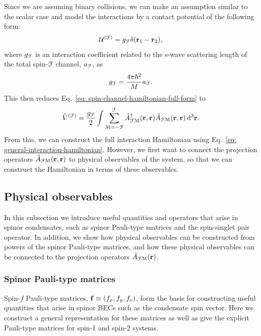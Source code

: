 Since we are assuming binary collisions, we can make an assumption similar to
the scalar case and model the interactions by a contact potential of the
following form:
\begin{align}
    \mathcal{U}^{(\EuScript{F})} = g_\EuScript{F}\delta(\vb{r}_1 - \vb{r}_2),
\end{align}
where \(g_\EuScript{F}\) is an interaction coefficient related to the s-wave
scattering length of the total spin-\(\EuScript{F}\) channel,
\(a_\EuScript{F}\), as
\begin{align}
    g_\EuScript{F} = \frac{4\pi\hbar^2}{M}a_\EuScript{F}.
\end{align}
This then reduces Eq.~\eqref{eq: spin-channel-hamiltonian-full-form} to
\begin{align}\label{eq: spin-channel-hamiltonian}
    \hat{V}^{(\EuScript{F})} = \frac{g_\EuScript{F}}{2}\int
    \sum_{\EuScript{M}=-\EuScript{F}}^{\EuScript{F}}
    \hat{A}^\dagger_{\EuScript{F}\EuScript{M}}(\vb{r}, \vb{r})
    \hat{A}_{\EuScript{F}\EuScript{M}}(\vb{r}, \vb{r}) \,
    \dd^3\vb{r}.
\end{align}
From this, we can construct the full interaction Hamiltonian using
Eq.~\eqref{eq: general-interaction-hamiltonian}.
However, we first want to connect the projection operators
\(\hat{A}_{\EuScript{F}\EuScript{M}}(\vb{r}, \vb{r})\) to physical observables
of the system, so that we can construct the Hamiltonian in terms of these
observables.

\subsection{Physical observables}
In this subsection we introduce useful quantities and operators that arise in
spinor condensates, such as spinor Pauli-type matrices and the spin-singlet pair
operator.
In addition, we show how physical observables can be constructed from powers
of the spinor Pauli-type matrices, and how these physical observables can be
connected to the projection operators
\(\hat{A}_{\EuScript{F}\EuScript{M}}(\vb{r})\).

\subsubsection{Spinor Pauli-type matrices}
Spin-\(f\) Pauli-type matrices, \(\vb{f}\equiv(f_x, f_y, f_z)\), form the
basis for constructing useful quantities that arise in spinor BECs such as the
condensate spin vector.
Here we construct a general representation for these matrices as well as give
the explicit Pauli-type matrices for spin-1 and spin-2 systems.

